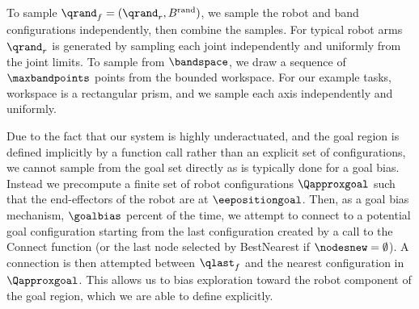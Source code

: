 To sample $\qrand_f = (\qrand_r,B^\textrm{rand})$, we sample the robot and band configurations independently, then combine the samples. For typical robot arms $\qrand_r$ is generated by sampling each joint independently and uniformly from the joint limits. To sample from $\bandspace$, we draw a sequence of $\maxbandpoints$ points from the bounded workspace. For our example tasks, workspace is a rectangular prism, and we sample each axis independently and uniformly.

Due to the fact that our system is highly underactuated, and the goal region is defined implicitly by a function call rather than an explicit set of configurations, we cannot sample from the goal set directly as is typically done for a goal bias. Instead we precompute a finite set of robot configurations $\Qapproxgoal$ such that the end-effectors of the robot are at $\eepositiongoal$. Then, as a goal bias mechanism, $\goalbias$ percent of the time, we attempt to connect to a potential goal configuration starting from the last configuration created by a call to the Connect function (or the last node selected by BestNearest if $\nodesnew = \emptyset$). A connection is then attempted between $\qlast_f$ and the nearest configuration in $\Qapproxgoal$. This allows us to bias exploration toward the robot component of the goal region, which we are able to define explicitly.


